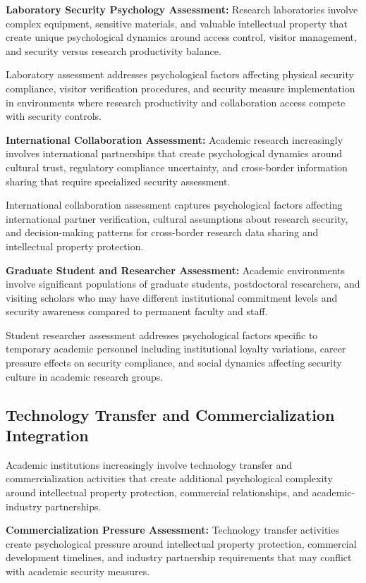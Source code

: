 \documentclass[10pt, twocolumn]{article}
\begin{document}
\textbf{Laboratory Security Psychology Assessment:} Research laboratories involve complex equipment, sensitive materials, and valuable intellectual property that create unique psychological dynamics around access control, visitor management, and security versus research productivity balance.

Laboratory assessment addresses psychological factors affecting physical security compliance, visitor verification procedures, and security measure implementation in environments where research productivity and collaboration access compete with security controls.

\textbf{International Collaboration Assessment:} Academic research increasingly involves international partnerships that create psychological dynamics around cultural trust, regulatory compliance uncertainty, and cross-border information sharing that require specialized security assessment.

International collaboration assessment captures psychological factors affecting international partner verification, cultural assumptions about research security, and decision-making patterns for cross-border research data sharing and intellectual property protection.

\textbf{Graduate Student and Researcher Assessment:} Academic environments involve significant populations of graduate students, postdoctoral researchers, and visiting scholars who may have different institutional commitment levels and security awareness compared to permanent faculty and staff.

Student researcher assessment addresses psychological factors specific to temporary academic personnel including institutional loyalty variations, career pressure effects on security compliance, and social dynamics affecting security culture in academic research groups.

\subsection{Technology Transfer and Commercialization Integration}

Academic institutions increasingly involve technology transfer and commercialization activities that create additional psychological complexity around intellectual property protection, commercial relationships, and academic-industry partnerships.

\textbf{Commercialization Pressure Assessment:} Technology transfer activities create psychological pressure around intellectual property protection, commercial development timelines, and industry partnership requirements that may conflict with academic security measures.
\end{document}
